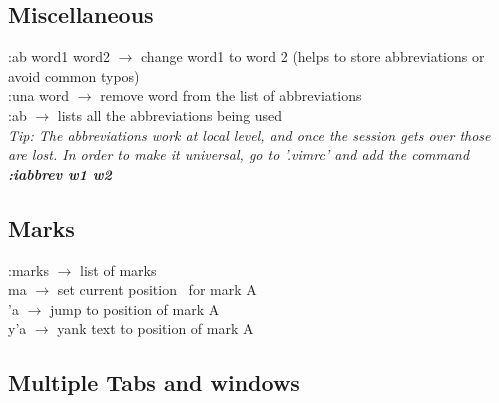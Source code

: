 \documentclass[twoside,a4paper]{article}
\newcommand{\tcb}{\color{blue}}
\newcommand{\tcc}{\color{cyan}}
\newcommand{\tcr}{\color{red}}
\newcommand{\tcg}{\color{gray}}
\newcommand{\tck}{\color{black}}
\newcommand{\ra }{$\rightarrow$ }
\newcommand{\hs}{\hspace}
\begin{document}
\begin{multicols}{2}
    \tcc \subsection{Miscellaneous}

    \tcr :ab \tcb  word1 word2 \tck
    \ra change word1 to word 2 (helps to store
    abbreviations or avoid common typos)\\
    \tcr :una \tcb  word \tck $\rightarrow$
    remove word from the list of abbreviations\\
    \tcr :ab \tck \ra lists all the
    abbreviations being used\\

    \hs{-0.5 cm}\tcg \textit{Tip: The abbreviations work
        at local level, and once the session gets over those are lost.
        In order to make it universal, go to '.vimrc' and add the
        command \textbf{:iabbrev w1 w2} }

    \tcc \subsection{Marks}

    \tcr :marks \tck \ra list of marks\\
    \tcr ma \tck \ra set current position \
    for mark A\\
    \tcr 'a \tck \ra jump to position of
    mark A\\
    \tcr y'a \tck \ra yank text to position
    of mark A

    \vspace{1 cm}
    \tcc \subsection{Multiple Tabs and windows}


\end{multicols}
\end{document}
